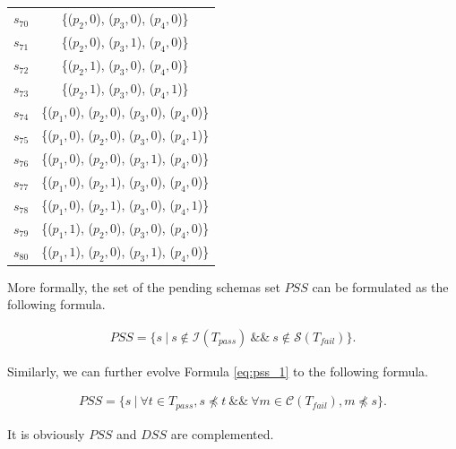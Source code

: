 \begin{table}[htbp]
\begin{tabular}{|c|c|}
  $s_{70}$ & \{($p_{2}, 0$), ($p_{3}, 0$), ($p_{4}, 0$)\}\\
  $s_{71}$ & \{($p_{2}, 0$), ($p_{3}, 1$), ($p_{4}, 0$)\}\\
  $s_{72}$ & \{($p_{2}, 1$), ($p_{3}, 0$), ($p_{4}, 0$)\}\\
  $s_{73}$ & \{($p_{2}, 1$), ($p_{3}, 0$), ($p_{4}, 1$)\}\\

  $s_{74}$ & \{($p_{1}, 0$), ($p_{2}, 0$), ($p_{3}, 0$), ($p_{4}, 0$)\} \\
  $s_{75}$ & \{($p_{1}, 0$), ($p_{2}, 0$), ($p_{3}, 0$), ($p_{4}, 1$)\} \\
  $s_{76}$ & \{($p_{1}, 0$), ($p_{2}, 0$), ($p_{3}, 1$), ($p_{4}, 0$)\} \\
  $s_{77}$ & \{($p_{1}, 0$), ($p_{2}, 1$), ($p_{3}, 0$), ($p_{4}, 0$)\} \\
  $s_{78}$ & \{($p_{1}, 0$), ($p_{2}, 1$), ($p_{3}, 0$), ($p_{4}, 1$)\} \\
  $s_{79}$ & \{($p_{1}, 1$), ($p_{2}, 0$), ($p_{3}, 0$), ($p_{4}, 0$)\} \\
  $s_{80}$ & \{($p_{1}, 1$), ($p_{2}, 0$), ($p_{3}, 1$), ($p_{4}, 0$)\} \\ \hline

    \end{tabular}%
\end{table}



More formally, the set of the pending schemas set $PSS$ can be formulated as the following formula.


\begin{equation}
\begin{aligned}\label{eq:pss_1}
PSS=\{ s\ |\ s \not\in  \mathcal{I}(T_{pass}) \ \&\& \  s \not\in \mathcal{S}(T_{fail}) \} .
\end{aligned}
\end{equation}

Similarly, we can further evolve Formula \ref{eq:pss_1} to the following formula.

\begin{equation}
\begin{aligned}\label{eq:pss}
PSS=\{ s\ |\ \forall t \in T_{pass},  s \npreceq t  \ \&\& \  \forall m \in \mathcal{C}(T_{fail}), m \npreceq s \}.
\end{aligned}
\end{equation}

It is obviously $PSS$ and $DSS$ are complemented.


